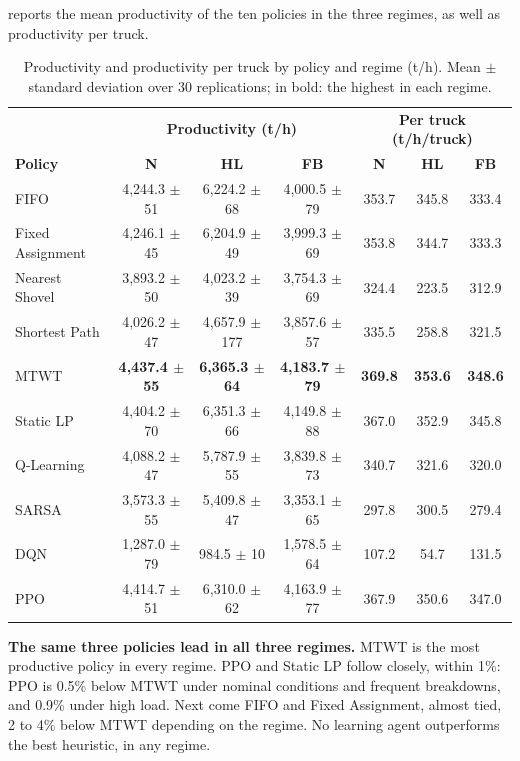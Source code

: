 \documentclass[11pt,a4paper]{article}
\newif\ifrevmarks
\newcommand{\revtag}[1]{\ifrevmarks\textsuperscript{\textcolor{red!70!black}{\scriptsize[#1]}}\fi}
\newenvironment{revbloc}[1]{\par\ifrevmarks\color{revcolor}\noindent\revtag{#1}\ \fi}{\par}
\newif\ifcorrmarks
\newcommand{\corr}[1]{\ifcorrmarks\textcolor{corrcolor}{#1}\else#1\fi}
\begin{document}
\begin{revbloc}{T31}
 reports the mean productivity of the ten policies in the three regimes, as well as productivity per truck.

\begin{table}[H]
\centering
\caption{Productivity and productivity per truck by policy and regime (t/h). Mean $\pm$ standard deviation over 30 replications; in bold: the highest in each regime.}
\label{tab:productivity}
\footnotesize\setlength{\tabcolsep}{3pt}
\begin{tabular}{@{}lccc|ccc@{}}
\toprule
 & \multicolumn{3}{c|}{\textbf{Productivity (t/h)}} & \multicolumn{3}{c}{\textbf{Per truck (t/h/truck)}} \\
\textbf{Policy} & \textbf{N} & \textbf{HL} & \textbf{FB} & \textbf{N} & \textbf{HL} & \textbf{FB} \\
\midrule
FIFO                 & 4,244.3 $\pm$ 51 & 6,224.2 $\pm$ 68 & 4,000.5 $\pm$ 79 & 353.7 & 345.8 & 333.4 \\
Fixed Assignment     & 4,246.1 $\pm$ 45 & 6,204.9 $\pm$ 49 & 3,999.3 $\pm$ 69 & 353.8 & 344.7 & 333.3 \\
Nearest Shovel       & 3,893.2 $\pm$ 50 & 4,023.2 $\pm$ 39 & 3,754.3 $\pm$ 69 & 324.4 & 223.5 & 312.9 \\
Shortest Path        & 4,026.2 $\pm$ 47 & 4,657.9 $\pm$ 177 & 3,857.6 $\pm$ 57 & 335.5 & 258.8 & 321.5 \\
MTWT                 & \textbf{4,437.4 $\pm$ 55} & \textbf{6,365.3 $\pm$ 64} & \textbf{4,183.7 $\pm$ 79} & \textbf{369.8} & \textbf{353.6} & \textbf{348.6} \\
\corr{Static LP}                   & 4,404.2 $\pm$ 70 & 6,351.3 $\pm$ 66 & 4,149.8 $\pm$ 88 & 367.0 & 352.9 & 345.8 \\
\midrule
Q-Learning           & 4,088.2 $\pm$ 47 & 5,787.9 $\pm$ 55 & 3,839.8 $\pm$ 73 & 340.7 & 321.6 & 320.0 \\
SARSA                & 3,573.3 $\pm$ 55 & 5,409.8 $\pm$ 47 & 3,353.1 $\pm$ 65 & 297.8 & 300.5 & 279.4 \\
DQN                  & 1,287.0 $\pm$ 79 & 984.5 $\pm$ 10 & 1,578.5 $\pm$ 64 & 107.2 & 54.7 & 131.5 \\
PPO                  & 4,414.7 $\pm$ 51 & 6,310.0 $\pm$ 62 & 4,163.9 $\pm$ 77 & 367.9 & 350.6 & 347.0 \\
\bottomrule
\end{tabular}
\end{table}

\textbf{The same three policies lead in all three regimes.} \corr{MTWT is the most productive policy in every regime.} PPO and \corr{Static LP} follow closely, within 1\%: \corr{PPO is 0.5\% below MTWT under nominal conditions and frequent breakdowns, and 0.9\% under high load.} Next come FIFO and Fixed Assignment, almost tied, 2 to 4\% below MTWT depending on the regime. No learning agent outperforms the best heuristic, in any regime.


\end{revbloc}
\end{document}
